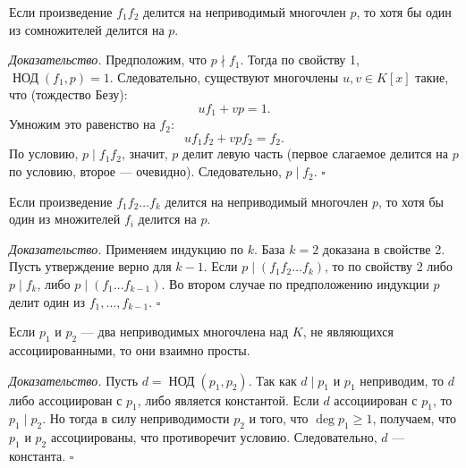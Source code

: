 \documentclass[a4paper,12pt]{article}
\theoremstyle{definition}
\theoremstyle{plain}
\theoremstyle{remark}
\begin{document}
	\medskip
	\begin{tcolorbox}[colback=blue!5, colframe=blue!40!black, title=Свойство 2 (Свойство простого делителя)]
		Если произведение \( f_1 f_2 \) делится на неприводимый многочлен \( p \), то хотя бы один из сомножителей делится на \( p \).
	\end{tcolorbox}
	
	\medskip
	\textit{Доказательство.}
	Предположим, что \( p \nmid f_1 \). Тогда по свойству 1, \( \operatorname{НОД}(f_1, p) = 1 \). Следовательно, существуют многочлены \( u, v \in K[x] \) такие, что (тождество Безу):
	\[
	u f_1 + v p = 1.
	\]
	Умножим это равенство на \( f_2 \):
	\[
	u f_1 f_2 + v p f_2 = f_2.
	\]
	По условию, \( p \mid f_1 f_2 \), значит, \( p \) делит левую часть (первое слагаемое делится на \( p \) по условию, второе — очевидно). Следовательно, \( p \mid f_2 \). \hfill \(\square\)
	
	\medskip
	\begin{tcolorbox}[colback=blue!5, colframe=blue!40!black, title=Свойство 3 (Обобщение на произведение)]
		Если произведение \( f_1 f_2 \dots f_k \) делится на неприводимый многочлен \( p \), то хотя бы один из множителей \( f_i \) делится на \( p \).
	\end{tcolorbox}
	
	\medskip
	\textit{Доказательство.}
	Применяем индукцию по \( k \). База \( k = 2 \) доказана в свойстве 2. Пусть утверждение верно для \( k-1 \). Если \( p \mid (f_1 f_2 \dots f_k) \), то по свойству 2 либо \( p \mid f_k \), либо \( p \mid (f_1 \dots f_{k-1}) \). Во втором случае по предположению индукции \( p \) делит один из \( f_1, \dots, f_{k-1} \). \hfill \(\square\)
	
	\medskip
	\begin{tcolorbox}[colback=blue!5, colframe=blue!40!black, title=Свойство 4 (Взаимная простота двух неприводимых)]
		Если \( p_1 \) и \( p_2 \) — два неприводимых многочлена над \( K \), не являющихся ассоциированными, то они взаимно просты.
	\end{tcolorbox}
	
	\medskip
	\textit{Доказательство.}
	Пусть \( d = \operatorname{НОД}(p_1, p_2) \). Так как \( d \mid p_1 \) и \( p_1 \) неприводим, то \( d \) либо ассоциирован с \( p_1 \), либо является константой. Если \( d \) ассоциирован с \( p_1 \), то \( p_1 \mid p_2 \). Но тогда в силу неприводимости \( p_2 \) и того, что \( \deg p_1 \geq 1 \), получаем, что \( p_1 \) и \( p_2 \) ассоциированы, что противоречит условию. Следовательно, \( d \) — константа. \hfill \(\square\)
	
\end{document}
